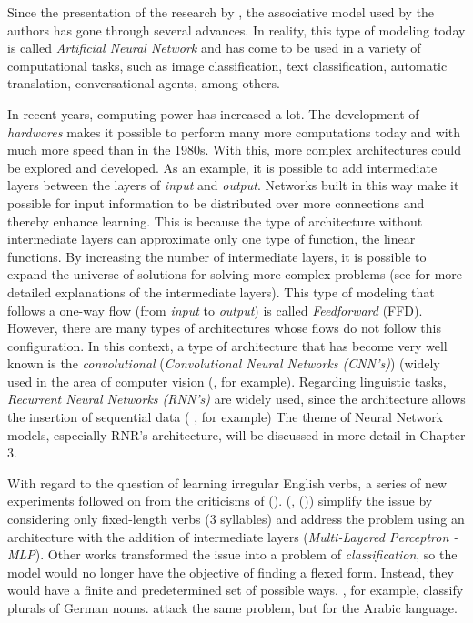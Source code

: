 Since the presentation of the research by \cite{rumelhart:1986}, the associative model used by the authors has gone through several advances. In reality, this type of modeling today is called \textit{Artificial Neural Network} and has come to be used in a variety of computational tasks, such as image classification, text classification, automatic translation, conversational agents, among others.

In recent years, computing power has increased a lot. The development of \textit{hardwares} makes it possible to perform many more computations today and with much more speed than in the 1980s. With this, more complex architectures could be explored and developed. As an example, it is possible to add intermediate layers between the layers of \textit{input} and \textit{output}. Networks built in this way make it possible for input information to be distributed over more connections and thereby enhance learning. This is because the type of architecture without intermediate layers can approximate only one type of function, the linear functions. By increasing the number of intermediate layers, it is possible to expand the universe of solutions for solving more complex problems (see \cite{Goodfellow-et-al-2016} for more detailed explanations of the intermediate layers). This type of modeling that follows a one-way flow (from \textit{input} to \textit{output}) is called \textit{Feedforward} (FFD). However, there are many types of architectures whose flows do not follow this configuration. In this context, a type of architecture that has become very well known is the \textit{convolutional} (\textit{Convolutional Neural Networks (CNN's)}) (widely used in the area of computer vision (\cite{Krizhevsky:2012}, for example). Regarding linguistic tasks, \textit{Recurrent Neural Networks (RNN's)} are widely used, since the architecture allows the insertion of sequential data (\cite{pengfei:2016} , for example) The theme of Neural Network models, especially RNR's architecture, will be discussed in more detail in Chapter 3.

With regard to the question of learning irregular English verbs, a series of new experiments followed on from the criticisms of (\cite{Pinker:1988}). (\cite{pluket:1991}, (\citeyear{PLUNKETT:1993})) simplify the issue by considering only fixed-length verbs (3 syllables) and address the problem using an architecture with the addition of intermediate layers (\textit{Multi-Layered Perceptron - MLP}). Other works transformed the issue into a problem of \textit{classification}, so the model would no longer have the objective of finding a flexed form. Instead, they would have a finite and predetermined set of possible ways. \cite{Nakisa1996WhereDD}, for example, classify plurals of German nouns. \cite{plunkett:1997} attack the same problem, but for the Arabic language.

